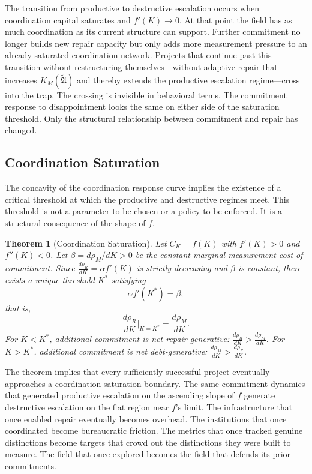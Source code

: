 \documentclass[12pt, a4paper]{article}
\theoremstyle{flyxion}
\newtheorem{theorem}{Theorem}
\newcommand{\fA}{\mathfrak{A}}
\newcommand{\rhoM}{\rho_{M}}
\newcommand{\rhoR}{\rho_{R}}
\newcommand{\KM}{K_{M}}
\begin{document}
The transition from productive to destructive escalation occurs when coordination capital saturates and $f'(K) \to 0$. At that point the field has as much coordination as its current structure can support. Further commitment no longer builds new repair capacity but only adds more measurement pressure to an already saturated coordination network. Projects that continue past this transition without restructuring themselves---without adaptive repair that increases $\KM(\tilde{\fA})$ and thereby extends the productive escalation regime---cross into the trap. The crossing is invisible in behavioral terms. The commitment response to disappointment looks the same on either side of the saturation threshold. Only the structural relationship between commitment and repair has changed.

\subsection*{Coordination Saturation}

The concavity of the coordination response curve implies the existence of a critical threshold at which the productive and destructive regimes meet. This threshold is not a parameter to be chosen or a policy to be enforced. It is a structural consequence of the shape of $f$.

\begin{theorem}[Coordination Saturation]
Let $C_K = f(K)$ with $f'(K) > 0$ and $f''(K) < 0$. Let $\beta = d\rhoM/dK > 0$ be the constant marginal measurement cost of commitment. Since $\frac{d\rhoR}{dK} = \alpha f'(K)$ is strictly decreasing and $\beta$ is constant, there exists a unique threshold $K^*$ satisfying
\[
  \alpha f'(K^*) = \beta,
\]
that is,
\[
  \frac{d\rhoR}{dK}\bigg|_{K=K^*} = \frac{d\rhoM}{dK}.
\]
For $K < K^*$, additional commitment is net repair-generative: $\frac{d\rhoR}{dK} > \frac{d\rhoM}{dK}$. For $K > K^*$, additional commitment is net debt-generative: $\frac{d\rhoM}{dK} > \frac{d\rhoR}{dK}$.
\end{theorem}

The theorem implies that every sufficiently successful project eventually approaches a coordination saturation boundary. The same commitment dynamics that generated productive escalation on the ascending slope of $f$ generate destructive escalation on the flat region near $f$'s limit. The infrastructure that once enabled repair eventually becomes overhead. The institutions that once coordinated become bureaucratic friction. The metrics that once tracked genuine distinctions become targets that crowd out the distinctions they were built to measure. The field that once explored becomes the field that defends its prior commitments.
\end{document}
